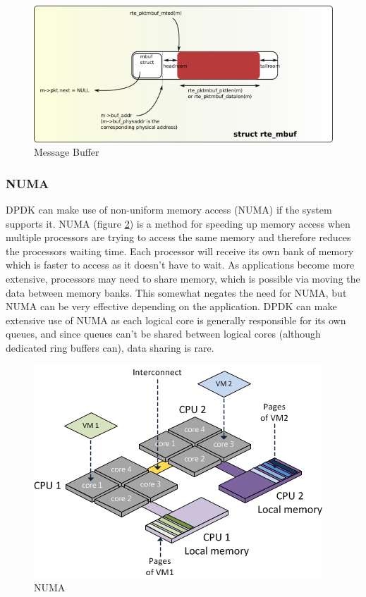 \documentclass[final_report.tex]{subfiles}
\begin{document}
\begin{figure}[H]
	\centering
	\includegraphics[width=\textwidth]{img/mbuf.png}
	\caption{Message Buffer}
	\label{fig:mbuf}
\end{figure}

\subsubsection{NUMA}
\label{subsec:numa}
DPDK can make use of non-uniform memory access (NUMA) if the system supports it. NUMA (figure \ref{fig:numa}) is a method for speeding up memory access when multiple processors are trying to access the same memory and therefore reduces the processors waiting time. Each processor will receive its own bank of memory which is faster to access as it doesn't have to wait. As applications become more extensive, processors may need to share memory, which is possible via moving the data between memory banks. This somewhat negates the need for NUMA, but NUMA can be very effective depending on the application. DPDK can make extensive use of NUMA as each logical core is generally responsible for its own queues, and since queues can't be shared between logical cores (although dedicated ring buffers can), data sharing is rare.

\begin{figure}[H]
	\centering
	\includegraphics[width=\textwidth/2]{img/numa.png}
	\caption{NUMA}
	\label{fig:numa}
\end{figure}
\end{document}
